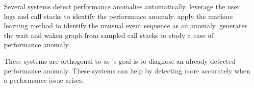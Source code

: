 Several systems detect performance
anomalies automatically. \cite{han2012performance, yuan2012conservative}
leverage the user logs and call stacks to identify the performance anomaly.
\cite{cohen2004correlating, saidi2008full, xu2009detecting, du2017deeplog}
apply the machine learning method to identify the unusual event sequence as an
anomaly. \cite{yu2014comprehending} generates the wait and waken graph from
sampled call stacks to study a case of performance anomaly.

These systems are orthogonal to \xxx as \xxx's goal is to diagnose an
already-detected performance anomaly. These systems can help \xxx by detecting
more accurately when a performance issue arises.
